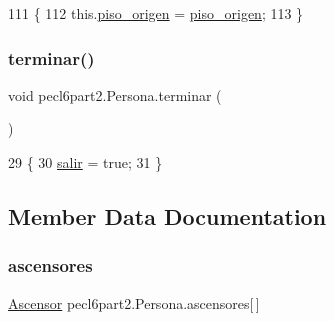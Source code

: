 \begin{DoxyCode}
111                                                 \{
112         this.\mbox{\hyperlink{classpecl6part2_1_1_persona_a64acff116f7c56e347369ec54c9109ad}{piso\_origen}} = \mbox{\hyperlink{classpecl6part2_1_1_persona_a64acff116f7c56e347369ec54c9109ad}{piso\_origen}};
113     \}
\end{DoxyCode}
\mbox{\label{classpecl6part2_1_1_persona_a30df78707ca9769785f4e648005c918c}} 
\subsubsection{\texorpdfstring{terminar()}{terminar()}}
{\footnotesize\ttfamily void pecl6part2.\+Persona.\+terminar (\begin{DoxyParamCaption}{ }\end{DoxyParamCaption})\hspace{0.3cm}{\ttfamily [inline]}}


\begin{DoxyCode}
29     \{
30         \mbox{\hyperlink{classpecl6part2_1_1_persona_a929d460e971bd1271927110d189bd9b0}{salir}} = \textcolor{keyword}{true};
31     \}
\end{DoxyCode}


\subsection{Member Data Documentation}
\mbox{\label{classpecl6part2_1_1_persona_a3e0fca0322fb911f7fb38ad78b46b70f}} 
\subsubsection{\texorpdfstring{ascensores}{ascensores}}
{\footnotesize\ttfamily \mbox{\hyperlink{classpecl6part2_1_1_ascensor}{Ascensor}} pecl6part2.\+Persona.\+ascensores\mbox{[}$\,$\mbox{]}\hspace{0.3cm}{\ttfamily [package]}}

\mbox{\label{classpecl6part2_1_1_persona_a8b7b7d11bc23cac7514d1e3c20267589}} 
